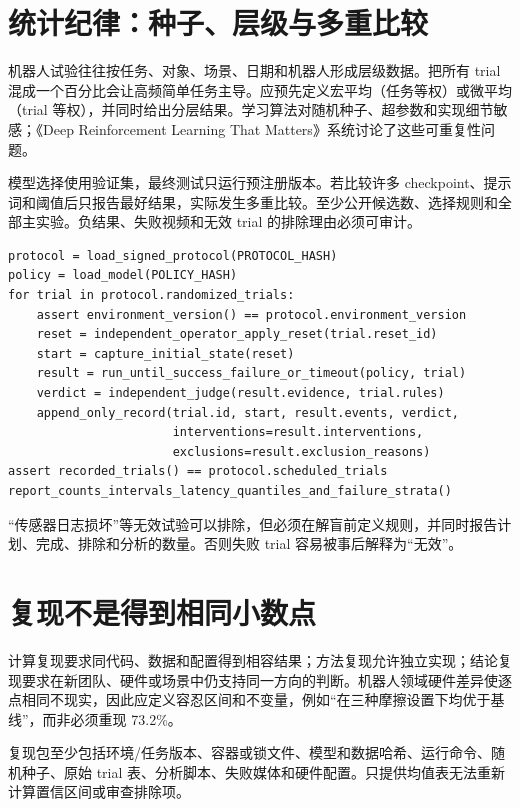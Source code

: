 \section{统计纪律：种子、层级与多重比较}

机器人试验往往按任务、对象、场景、日期和机器人形成层级数据。把所有 trial 混成一个百分比会让高频简单任务主导。应预先定义宏平均（任务等权）或微平均（trial 等权），并同时给出分层结果。学习算法对随机种子、超参数和实现细节敏感；《Deep Reinforcement Learning That Matters》系统讨论了这些可重复性问题\cite{henderson2018deeprl}。

模型选择使用验证集，最终测试只运行预注册版本。若比较许多 checkpoint、提示词和阈值后只报告最好结果，实际发生多重比较。至少公开候选数、选择规则和全部主实验。负结果、失败视频和无效 trial 的排除理由必须可审计。

\begin{lstlisting}[caption={预注册真机评测与完整计数的教学伪代码}]
protocol = load_signed_protocol(PROTOCOL_HASH)
policy = load_model(POLICY_HASH)
for trial in protocol.randomized_trials:
    assert environment_version() == protocol.environment_version
    reset = independent_operator_apply_reset(trial.reset_id)
    start = capture_initial_state(reset)
    result = run_until_success_failure_or_timeout(policy, trial)
    verdict = independent_judge(result.evidence, trial.rules)
    append_only_record(trial.id, start, result.events, verdict,
                       interventions=result.interventions,
                       exclusions=result.exclusion_reasons)
assert recorded_trials() == protocol.scheduled_trials
report_counts_intervals_latency_quantiles_and_failure_strata()
\end{lstlisting}

“传感器日志损坏”等无效试验可以排除，但必须在解盲前定义规则，并同时报告计划、完成、排除和分析的数量。否则失败 trial 容易被事后解释为“无效”。

\section{复现不是得到相同小数点}

计算复现要求同代码、数据和配置得到相容结果；方法复现允许独立实现；结论复现要求在新团队、硬件或场景中仍支持同一方向的判断。机器人领域硬件差异使逐点相同不现实，因此应定义容忍区间和不变量，例如“在三种摩擦设置下均优于基线”，而非必须重现 73.2\%。

复现包至少包括环境/任务版本、容器或锁文件、模型和数据哈希、运行命令、随机种子、原始 trial 表、分析脚本、失败媒体和硬件配置。只提供均值表无法重新计算置信区间或审查排除项。

